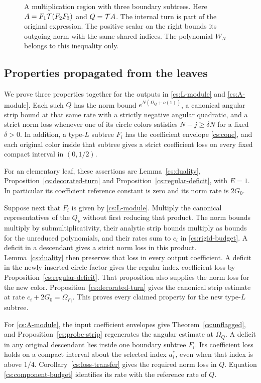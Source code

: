 \begin{figure}[t]
\centering
\caption{A multiplication region with three boundary subtrees.
Here \(A=F_1\mathcal T(F_2F_3)\) and \(Q=\mathcal T A\). The internal
turn is part of the original expression. The positive scalar on the
right bounds its outgoing norm with the same shared indices.
The polynomial \(W_N\) belongs to this inequality only.}
\label{cs:component-figure}
\end{figure}

\subsection{Properties propagated from the leaves}

We prove three properties together for the outputs in
\eqref{cs:L-module} and \eqref{cs:A-module}. Each such $Q$ has
the norm bound \(e^{N(\Omega_Q+o(1))}\), a canonical angular strip
bound at that same rate with a strictly negative angular quadratic,
and a strict norm loss whenever one of its circle colors satisfies
$N-j\ge\delta N$ for a fixed $\delta>0$. In addition, a type-\(L\) subtree \(F_i\) has
the coefficient envelope \eqref{cs:cone}, and each original color
inside that subtree gives a strict coefficient loss on every fixed
compact interval in \((0,1/2)\).

For an elementary leaf, these assertions are
Lemma~\ref{cs:duality}, Proposition~\ref{cs:decorated-turn} and
Proposition~\ref{cs:regular-deficit}, with \(E=1\).
In particular its coefficient reference constant is zero and its
norm rate is \(2G_0\).

Suppose next that \(F_i\) is given by \eqref{cs:L-module}.
Multiply the canonical representatives of the \(Q_\nu\) without first
reducing that product. The norm bounds multiply by
submultiplicativity, their analytic strip bounds multiply as bounds for the unreduced
polynomials, and their rates sum to \(c_i\) in
\eqref{cs:rigid-budget}. A deficit in a descendant gives a strict
norm loss in this product. Lemma~\ref{cs:duality} then preserves
that loss in every output coefficient. A deficit in the newly
inserted circle factor gives the regular-index coefficient loss by
Proposition~\ref{cs:regular-deficit}. That proposition also supplies
the norm loss for the new color. Proposition~\ref{cs:decorated-turn}
gives the canonical strip estimate at rate \(c_i+2G_0=\Omega_{F_i}\).
This proves every claimed property for the new type-\(L\) subtree.

For \eqref{cs:A-module}, the input coefficient envelopes give
Theorem~\ref{cs:unflagged}, and Proposition~\ref{cs:probe-strip}
regenerates the angular estimate at \(\Omega_Q\). A deficit in any
original descendant lies inside one boundary subtree \(F_i\).
Its coefficient loss holds on a compact interval about the
selected index \(a_i^*\), even when that index is above \(1/4\).
Corollary~\ref{cs:loss-transfer} gives the required norm loss in
\(Q\). Equation \eqref{cs:component-budget} identifies its rate
with the reference rate of $Q$.

